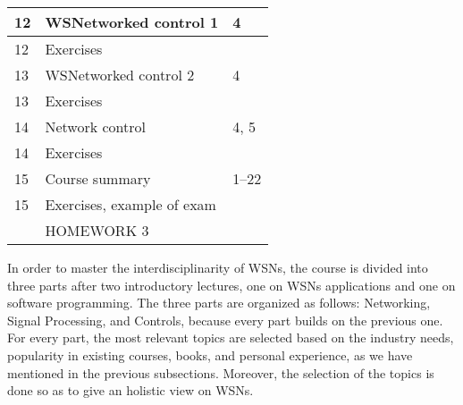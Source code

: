 \documentclass[onecolumn,12pt,draftclsnofoot,a4paper,peerreview]{IEEEtran}
\begin{document}
\begin{table}[t]
\begin{center}
\begin{tabular}{||  l || l  || l  ||  }
       \hline
    \hline 12 & WSNetworked control 1 & 4 \\
      \hline 12 & Exercises &  \\
    \hline 13 & WSNetworked control 2  &  4 \\
      \hline 13 & Exercises &  \\
    \hline 14 & Network control  &  4, 5 \\
      \hline 14 & Exercises &  \\
    \hline 15 & Course summary & 1--22 \\
      \hline 15 & Exercises, example of exam &  \\
      \hline
     \hline   & HOMEWORK 3 &   \\
       \hline
    \hline
  \end{tabular}
  \label{tab:course-proposal}
\end{center}
\end{table}

In order to master the interdisciplinarity of WSNs, the course is divided into three parts after two introductory lectures, one on WSNs applications and one on software programming. The three parts are organized as follows: Networking, Signal Processing, and Controls, because every part builds on the previous one. For every part, the most relevant topics are selected based on the industry needs, popularity in existing courses, books, and personal experience, as we have mentioned in the previous subsections. Moreover, the selection of the topics is done so as to give an holistic view on WSNs. 
\end{document}
